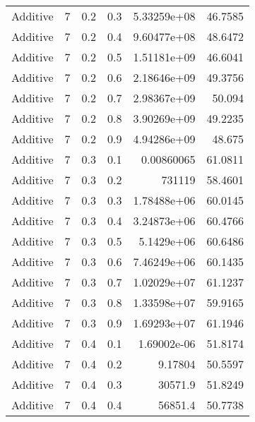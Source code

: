 \documentclass{article}
\begin{document}
\begin{longtable}[H]{lrrrrr}
 Additive       &       7 &   0.2 &            0.3 &      5.33259e+08 &         46.7585 \\
 Additive       &       7 &   0.2 &            0.4 &      9.60477e+08 &         48.6472 \\
 Additive       &       7 &   0.2 &            0.5 &      1.51181e+09 &         46.6041 \\
 Additive       &       7 &   0.2 &            0.6 &      2.18646e+09 &         49.3756 \\
 Additive       &       7 &   0.2 &            0.7 &      2.98367e+09 &         50.094  \\
 Additive       &       7 &   0.2 &            0.8 &      3.90269e+09 &         49.2235 \\
 Additive       &       7 &   0.2 &            0.9 &      4.94286e+09 &         48.675  \\
 Additive       &       7 &   0.3 &            0.1 &      0.00860065  &         61.0811 \\
 Additive       &       7 &   0.3 &            0.2 & 731119           &         58.4601 \\
 Additive       &       7 &   0.3 &            0.3 &      1.78488e+06 &         60.0145 \\
 Additive       &       7 &   0.3 &            0.4 &      3.24873e+06 &         60.4766 \\
 Additive       &       7 &   0.3 &            0.5 &      5.1429e+06  &         60.6486 \\
 Additive       &       7 &   0.3 &            0.6 &      7.46249e+06 &         60.1435 \\
 Additive       &       7 &   0.3 &            0.7 &      1.02029e+07 &         61.1237 \\
 Additive       &       7 &   0.3 &            0.8 &      1.33598e+07 &         59.9165 \\
 Additive       &       7 &   0.3 &            0.9 &      1.69293e+07 &         61.1946 \\
 Additive       &       7 &   0.4 &            0.1 &      1.69002e-06 &         51.8174 \\
 Additive       &       7 &   0.4 &            0.2 &      9.17804     &         50.5597 \\
 Additive       &       7 &   0.4 &            0.3 &  30571.9         &         51.8249 \\
 Additive       &       7 &   0.4 &            0.4 &  56851.4         &         50.7738 \\

\end{longtable}
\end{document}

